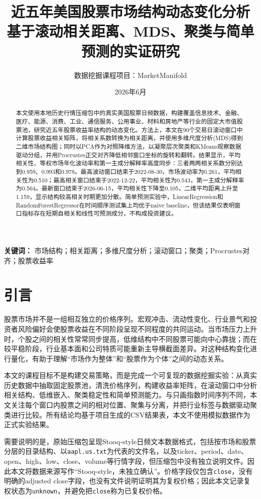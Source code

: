 \documentclass[UTF8,zihao=-4]{ctexart}
\title{\heiti 近五年美国股票市场结构动态变化分析\\
\large 基于滚动相关距离、MDS、聚类与简单预测的实证研究}
\author{数据挖掘课程项目：MarketManifold}
\date{2026年6月}
\begin{document}
\maketitle

\begin{abstract}
本文使用本地历史行情压缩包中的真实美国股票日频数据，构建覆盖信息技术、金融、医疗、能源、消费、工业、通信服务、公用事业、材料和房地产等行业的固定大市值股票池，研究近五年股票收益率结构的动态变化。方法上，本文在90个交易日滚动窗口中计算股票收益相关矩阵，将相关系数转换为相关距离，并使用多维尺度分析(MDS)得到二维市场结构图；同时以PCA作为对照降维方法，以凝聚层次聚类和KMeans观察数据驱动分组，并用Procrustes正交对齐降低相邻窗口坐标的旋转和翻转。结果显示，平均相关性、等权市场年化波动率和第一主成分解释率高度同步：三者两两相关系数分别达到0.959、0.993和0.978。最高波动窗口结束于2022-08-30，市场波动率为0.261，平均相关性为0.510；最高相关窗口结束于2022-12-22，平均相关性为0.543，第一主成分解释率为0.564。最新窗口结束于2026-06-15，平均相关性下降至0.105，二维平均距离上升至1.159，显示结构较高相关时期更加分散。简单预测实验中，LinearRegression和RandomForestRegressor在时间顺序测试集上均优于naive baseline，但该结果仅表明窗口指标存在短期自相关和线性可预测成分，不构成投资建议。
\end{abstract}

\noindent\textbf{关键词：} 市场结构；相关距离；多维尺度分析；滚动窗口；聚类；Procrustes对齐；股票收益率

\section{引言}
股票市场并不是一组相互独立的价格序列。宏观冲击、流动性变化、行业景气和投资者风险偏好会使股票收益在不同阶段呈现不同程度的共同运动。当市场压力上升时，个股之间的相关性常常同步提高，低维结构中不同股票可能向中心靠拢；而在较平稳阶段，行业基本面和公司特质可能重新主导横截面差异。对这种结构变化进行量化，有助于理解“市场作为整体”和“股票作为个体”之间的动态关系。

本文的课程目标不是构建交易策略，而是完成一个可复现的数据挖掘实验：从真实历史数据中抽取固定股票池，清洗价格序列，构建收益率矩阵，在滚动窗口中分析相关结构、低维嵌入、聚类稳定性和简单预测能力。与只画指数时间序列不同，本文关注每个窗口内股票之间的相对位置、聚集与分离，并把行业标签与数据驱动聚类进行比较。所有结论均基于项目生成的CSV结果表，本文不使用模拟数据作为正式实验结果。

需要说明的是，原始压缩包呈现Stooq-style日频文本数据格式，包括按市场和股票分层的目录结构、以\texttt{aapl.us.txt}为代表的文件名，以及ticker、period、date、open、high、low、close、volume等行情字段，但压缩包中没有独立说明文件。因此本文将数据来源写作“Stooq-style，未独立确认”。价格字段仅包含\texttt{close}，没有明确的adjusted close字段，也没有文件说明证明其为复权价格；因此本文记录复权状态为\texttt{unknown}，并避免把\texttt{close}称为已复权价格。
\end{document}
